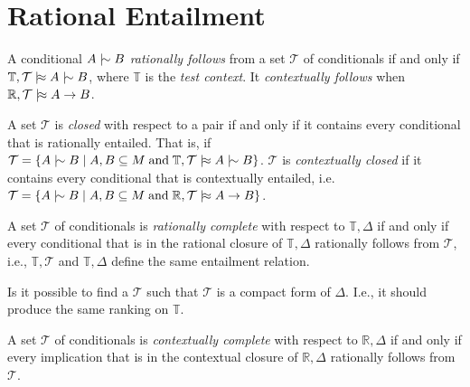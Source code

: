 
\chapter{Rational Entailment}
\begin{definition}
	A conditional $A \twiddle B$ \emph{rationally follows} from a set $\mathcal{T}$ of conditionals if and only if
	$\mathbb{T}, \mathcal{T}\dentails A \twiddle B$, where $\mathbb{T}$ is the \emph{test context}. It \emph{contextually
	follows} when $\mathbb{R}, \mathcal{T}\mid\hskip-0.40ex\approx A \rightarrow B$.
\end{definition}

\begin{definition}
	A set $\mathcal{T}$ is \emph{closed} with respect to a pair if and only if it contains every conditional that is
	rationally entailed. That is, if
	$\mathcal{T}= \{A \twiddle B \mid A,B \subseteq M \tand \mathbb{T},\mathcal{T}\dentails A \twiddle B\}$. $\mathcal{T}$
	is \emph{contextually closed} if it contains every conditional that is contextually entailed, i.e.
	$\mathcal{T}= \{A \twiddle B \mid A,B \subseteq M \tand \mathbb{R}, \mathcal{T}\dentails A \rightarrow B\}$.
\end{definition}

\begin{definition}
	A set $\mathcal{T}$ of conditionals is \emph{rationally complete} with respect to $\mathbb{T},\Delta$ if and only if
	every conditional that is in the rational closure of $\mathbb{T}, \Delta$ rationally follows from $\mathcal{T}$, i.e.,
	$\mathbb{T},\mathcal{T}$ and $\mathbb{T}, \Delta$ define the same entailment relation.
\end{definition}

Is it possible to find a $\mathcal{T}$ such that $\mathcal{T}$ is a compact form of $\Delta$. I.e., it should produce the
same ranking on $\mathbb{T}$.

\begin{definition}
	A set $\mathcal{T}$ of conditionals is \emph{contextually complete} with respect to $\mathbb{R}, \Delta$ if and only
	if every implication that is in the contextual closure of $\mathbb{R}, \Delta$ rationally follows from $\mathcal{T}$.
\end{definition}

